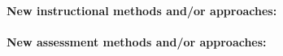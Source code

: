 
\paragraph{New instructional methods and/or approaches:}

\paragraph{New assessment methods and/or approaches:}

